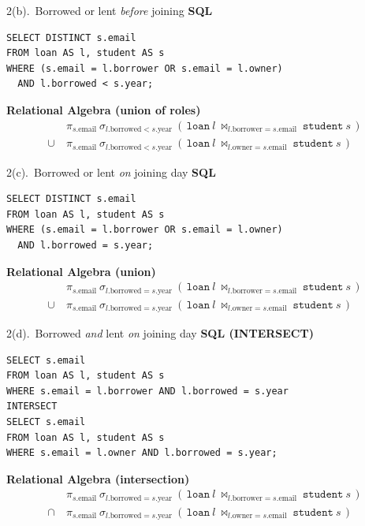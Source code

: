 \documentclass{beamer}
\begin{document}
\begin{frame}[fragile]{2(b).\ Borrowed or lent \emph{before} joining}
\small
\textbf{SQL}
\begin{lstlisting}
SELECT DISTINCT s.email
FROM loan AS l, student AS s
WHERE (s.email = l.borrower OR s.email = l.owner)
  AND l.borrowed < s.year;
\end{lstlisting}

\small
\textbf{Relational Algebra (union of roles)}
\[
\begin{aligned}
&\pi_{s.\text{email}}\ \sigma_{l.\text{borrowed}<s.\text{year}}\ (\,\texttt{loan}\ l\ \bowtie_{l.\text{borrower}=s.\text{email}}\ \texttt{student}\ s\,)\\
\cup\ &\pi_{s.\text{email}}\ \sigma_{l.\text{borrowed}<s.\text{year}}\ (\,\texttt{loan}\ l\ \bowtie_{l.\text{owner}=s.\text{email}}\ \texttt{student}\ s\,)
\end{aligned}
\]
\end{frame}

\begin{frame}[fragile]{2(c).\ Borrowed or lent \emph{on} joining day}
\small
\textbf{SQL}
\begin{lstlisting}
SELECT DISTINCT s.email
FROM loan AS l, student AS s
WHERE (s.email = l.borrower OR s.email = l.owner)
  AND l.borrowed = s.year;
\end{lstlisting}

\small
\textbf{Relational Algebra (union)}
\[
\begin{aligned}
&\pi_{s.\text{email}}\ \sigma_{l.\text{borrowed}=s.\text{year}}\ (\,\texttt{loan}\ l\ \bowtie_{l.\text{borrower}=s.\text{email}}\ \texttt{student}\ s\,)\\
\cup\ &\pi_{s.\text{email}}\ \sigma_{l.\text{borrowed}=s.\text{year}}\ (\,\texttt{loan}\ l\ \bowtie_{l.\text{owner}=s.\text{email}}\ \texttt{student}\ s\,)
\end{aligned}
\]
\end{frame}

\begin{frame}[fragile]{2(d).\ Borrowed \emph{and} lent \emph{on} joining day}
\small
\textbf{SQL (INTERSECT)}
\begin{lstlisting}
SELECT s.email
FROM loan AS l, student AS s
WHERE s.email = l.borrower AND l.borrowed = s.year
INTERSECT
SELECT s.email
FROM loan AS l, student AS s
WHERE s.email = l.owner AND l.borrowed = s.year;
\end{lstlisting}

\small
\textbf{Relational Algebra (intersection)}
\[
\begin{aligned}
&\pi_{s.\text{email}}\ \sigma_{l.\text{borrowed}=s.\text{year}}\ (\,\texttt{loan}\ l\ \bowtie_{l.\text{borrower}=s.\text{email}}\ \texttt{student}\ s\,)\\
\cap\ &\pi_{s.\text{email}}\ \sigma_{l.\text{borrowed}=s.\text{year}}\ (\,\texttt{loan}\ l\ \bowtie_{l.\text{owner}=s.\text{email}}\ \texttt{student}\ s\,)
\end{aligned}
\]
\end{frame}
\end{document}
